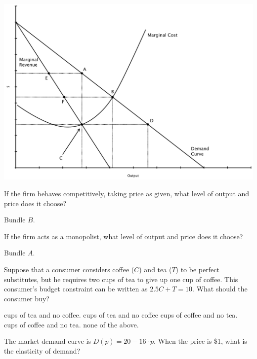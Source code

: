 \documentclass[12pt,addpoints]{exam}
\begin{document}
\begin{questions}

\begin{center}
\includegraphics[scale=.43]{fig1.pdf}
\end{center}

\myquestion[5] If the firm behaves competitively, taking price as given, what
level of output and price does it choose?
	\answerline

	\begin{solution}
	Bundle $B$.
	\end{solution}

\myquestion[5] If the firm acts as a monopolist, what level of output and price
does it choose?
	\answerline 

	\begin{solution}
	Bundle $A$.
	\end{solution}

\myquestion[5] Suppose that a consumer considers coffee ($C$) and tea ($T$) to be perfect substitutes, but he
requires two cups of tea to give up one cup of coffee. This consumer's budget constraint
can be written as $2.5C + T = 10$. What should the consumer buy?
	\begin{choices}
	 cups of tea and no coffee.
	 cups of tea and no coffee
	 cups of coffee and no tea.
	 cups of coffee and no tea.
	\choice none of the above.
	\end{choices}

\myquestion[5] The market demand curve is $D\left( p \right) = 20 - 16\cdot p$.  When
the price is \$1, what is the elasticity of demand?
\answerline


\end{questions}
\end{document}
